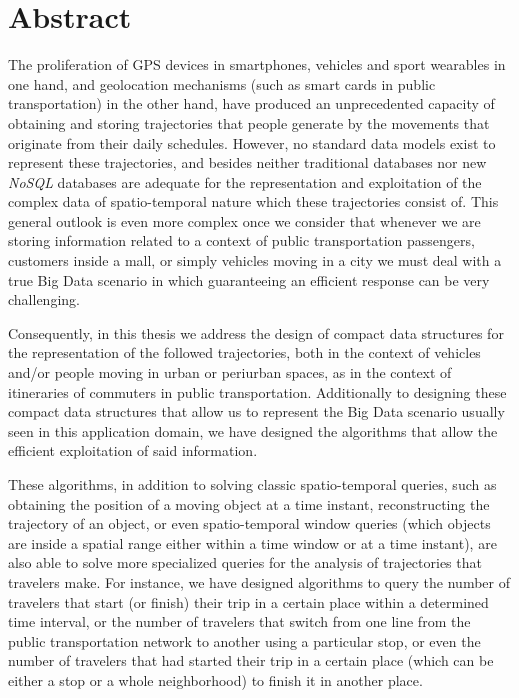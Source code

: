 
\chapter*{Abstract}

The proliferation of GPS devices in smartphones, vehicles and sport wearables in one hand, and geolocation mechanisms (such as smart cards in public transportation) in the other hand, have produced an unprecedented capacity of obtaining and storing trajectories that people generate by the movements that originate from their daily schedules. However, no standard data models exist to represent these trajectories, and besides neither traditional databases nor new \textit{NoSQL} databases are adequate for the representation and exploitation of the complex data of spatio-temporal nature which these trajectories consist of. This general outlook is even more complex once we consider that whenever we are storing information related to a context of public transportation passengers, customers inside a mall, or simply vehicles moving in a city we must deal with a true Big Data scenario in which guaranteeing an efficient response can be very challenging.

Consequently, in this thesis we address the design of compact data structures for the representation of the followed trajectories, both in the context of vehicles and/or people moving in urban or periurban spaces, as in the context of itineraries of commuters in public transportation. Additionally to designing these compact data structures that allow us to represent the Big Data scenario usually seen in this application domain, we have designed the algorithms that allow the efficient exploitation of said information.

These algorithms, in addition to solving classic spatio-temporal queries, such as obtaining the position of a moving object at a time instant, reconstructing the trajectory of an object, or even spatio-temporal window queries (which objects are inside a spatial range either within a time window or at a time instant), are also able to solve more specialized queries for the analysis of trajectories that travelers make. For instance, we have designed algorithms to query the number of travelers that start (or finish) their trip in a certain place within a determined time interval, or the number of travelers that switch from one line from the public transportation network to another using a particular stop, or even the number of travelers that had started their trip in a certain place (which can be either a stop or a whole neighborhood) to finish it in another place.

